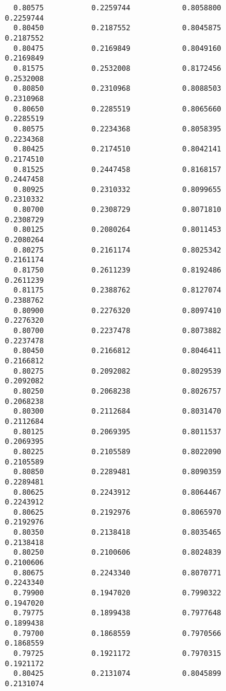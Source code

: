 \documentclass[
  letterpaper,
  DIV=11,
  numbers=noendperiod]{scrartcl}
\begin{document}
\begin{verbatim}
  0.80575           0.2259744            0.8058800            0.2259744     
  0.80450           0.2187552            0.8045875            0.2187552     
  0.80475           0.2169849            0.8049160            0.2169849     
  0.81575           0.2532008            0.8172456            0.2532008     
  0.80850           0.2310968            0.8088503            0.2310968     
  0.80650           0.2285519            0.8065660            0.2285519     
  0.80575           0.2234368            0.8058395            0.2234368     
  0.80425           0.2174510            0.8042141            0.2174510     
  0.81525           0.2447458            0.8168157            0.2447458     
  0.80925           0.2310332            0.8099655            0.2310332     
  0.80700           0.2308729            0.8071810            0.2308729     
  0.80125           0.2080264            0.8011453            0.2080264     
  0.80275           0.2161174            0.8025342            0.2161174     
  0.81750           0.2611239            0.8192486            0.2611239     
  0.81175           0.2388762            0.8127074            0.2388762     
  0.80900           0.2276320            0.8097410            0.2276320     
  0.80700           0.2237478            0.8073882            0.2237478     
  0.80450           0.2166812            0.8046411            0.2166812     
  0.80275           0.2092082            0.8029539            0.2092082     
  0.80250           0.2068238            0.8026757            0.2068238     
  0.80300           0.2112684            0.8031470            0.2112684     
  0.80125           0.2069395            0.8011537            0.2069395     
  0.80225           0.2105589            0.8022090            0.2105589     
  0.80850           0.2289481            0.8090359            0.2289481     
  0.80625           0.2243912            0.8064467            0.2243912     
  0.80625           0.2192976            0.8065970            0.2192976     
  0.80350           0.2138418            0.8035465            0.2138418     
  0.80250           0.2100606            0.8024839            0.2100606     
  0.80675           0.2243340            0.8070771            0.2243340     
  0.79900           0.1947020            0.7990322            0.1947020     
  0.79775           0.1899438            0.7977648            0.1899438     
  0.79700           0.1868559            0.7970566            0.1868559     
  0.79725           0.1921172            0.7970315            0.1921172     
  0.80425           0.2131074            0.8045899            0.2131074     

\end{verbatim}
\end{document}
